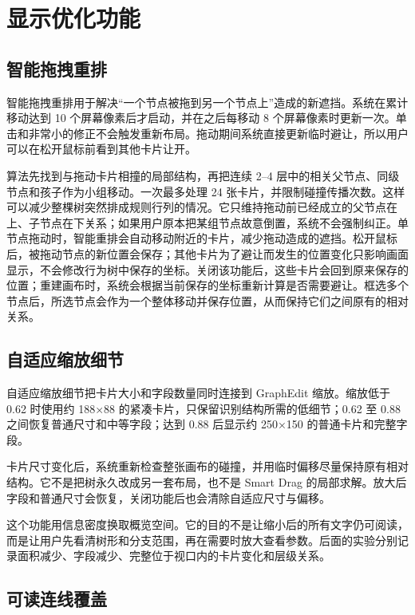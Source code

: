 \documentclass[11pt,a4paper,oneside,extrafontsizes]{memoir}
\begin{document}
\section{显示优化功能}

\subsection{智能拖拽重排}

智能拖拽重排用于解决“一个节点被拖到另一个节点上”造成的新遮挡。系统在累计移动达到 10 个屏幕像素后才启动，并在之后每移动 8 个屏幕像素时更新一次。单击和非常小的修正不会触发重新布局。拖动期间系统直接更新临时避让，所以用户可以在松开鼠标前看到其他卡片让开。

算法先找到与拖动卡片相撞的局部结构，再把连续 2–4 层中的相关父节点、同级节点和孩子作为小组移动。一次最多处理 24 张卡片，并限制碰撞传播次数。这样可以减少整棵树突然排成规则行列的情况。它只维持拖动前已经成立的父节点在上、子节点在下关系；如果用户原本把某组节点故意倒置，系统不会强制纠正。单节点拖动时，智能重排会自动移动附近的卡片，减少拖动造成的遮挡。松开鼠标后，被拖动节点的新位置会保存；其他卡片为了避让而发生的位置变化只影响画面显示，不会修改行为树中保存的坐标。关闭该功能后，这些卡片会回到原来保存的位置；重建画布时，系统会根据当前保存的坐标重新计算是否需要避让。框选多个节点后，所选节点会作为一个整体移动并保存位置，从而保持它们之间原有的相对关系。

\subsection{自适应缩放细节}

自适应缩放细节把卡片大小和字段数量同时连接到 GraphEdit 缩放。缩放低于 0.62 时使用约 188×88 的紧凑卡片，只保留识别结构所需的低细节；0.62 至 0.88 之间恢复普通尺寸和中等字段；达到 0.88 后显示约 250×150 的普通卡片和完整字段。

卡片尺寸变化后，系统重新检查整张画布的碰撞，并用临时偏移尽量保持原有相对结构。它不是把树永久改成另一套布局，也不是 Smart Drag 的局部求解。放大后字段和普通尺寸会恢复，关闭功能后也会清除自适应尺寸与偏移。

这个功能用信息密度换取概览空间。它的目的不是让缩小后的所有文字仍可阅读，而是让用户先看清树形和分支范围，再在需要时放大查看参数。后面的实验分别记录面积减少、字段减少、完整位于视口内的卡片变化和层级关系。

\subsection{可读连线覆盖}
\end{document}
